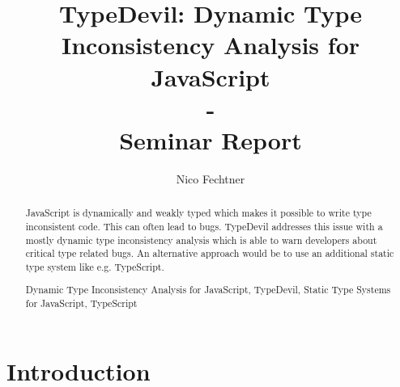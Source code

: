 \documentclass[runningheads,a4paper]{llncs}
\newcommand{\keywords}[1]{\par\addvspace\baselineskip

\noindent\keywordname\enspace\ignorespaces#1}
\begin{document}
\mainmatter  %

\title{TypeDevil: Dynamic Type Inconsistency Analysis for JavaScript\\-\\Seminar Report}


\author{Nico Fechtner}
%


%
%

\toctitle{}
\tocauthor{}
\maketitle

\tableofcontents
\newpage

\begin{abstract}
JavaScript is dynamically and weakly typed which makes it possible to write type inconsistent code. 
This can often lead to bugs. 
TypeDevil addresses this issue with a mostly dynamic type inconsistency analysis which is able to warn developers about critical type related bugs.
An alternative approach would be to use an additional static type system like e.g. TypeScript.
\keywords{Dynamic Type Inconsistency Analysis for JavaScript, TypeDevil, Static Type Systems for JavaScript, TypeScript}
\end{abstract}


\section{Introduction}
\end{document}
